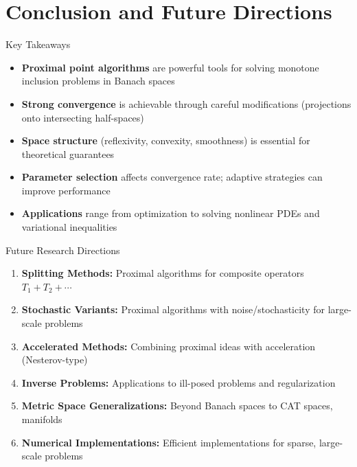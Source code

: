 \documentclass[aspectratio=169,10pt]{beamer}
\begin{document}
\section{Conclusion and Future Directions}

\begin{frame}{Key Takeaways}
    \begin{itemize}
        \item \textbf{Proximal point algorithms} are powerful tools for solving
              monotone inclusion problems in Banach spaces

        \item \textbf{Strong convergence} is achievable through careful modifications
              (projections onto intersecting half-spaces)

        \item \textbf{Space structure} (reflexivity, convexity, smoothness) is essential
              for theoretical guarantees

        \item \textbf{Parameter selection} affects convergence rate; adaptive strategies
              can improve performance

        \item \textbf{Applications} range from optimization to solving nonlinear PDEs
              and variational inequalities
    \end{itemize}
\end{frame}

\begin{frame}{Future Research Directions}
    \begin{enumerate}
        \item \textbf{Splitting Methods:} Proximal algorithms for composite operators
              $T_1 + T_2 + \cdots$

        \item \textbf{Stochastic Variants:} Proximal algorithms with noise/stochasticity
              for large-scale problems

        \item \textbf{Accelerated Methods:} Combining proximal ideas with acceleration
              (Nesterov-type)

        \item \textbf{Inverse Problems:} Applications to ill-posed problems and regularization

        \item \textbf{Metric Space Generalizations:} Beyond Banach spaces to CAT spaces,
              manifolds

        \item \textbf{Numerical Implementations:} Efficient implementations for sparse,
              large-scale problems
    \end{enumerate}
\end{frame}
\end{document}
